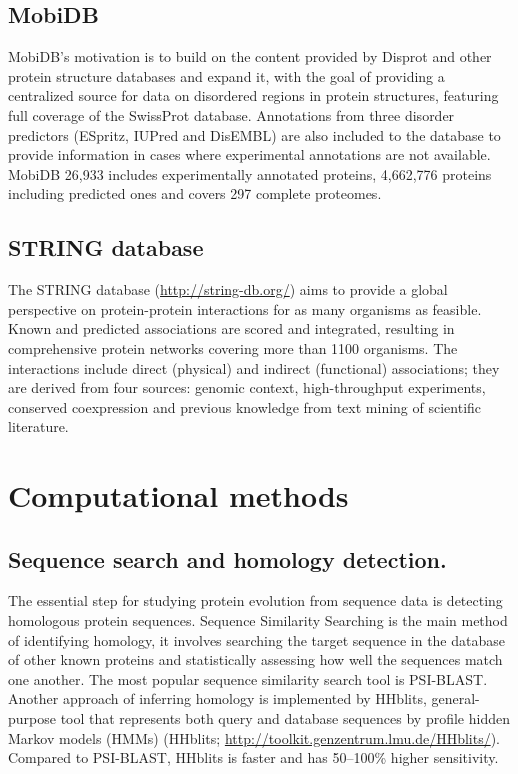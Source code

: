 \documentclass[11pt, a4paper,oneside]{report}
\begin{document}
\subsection{MobiDB}
MobiDB's motivation is to build on the content provided by Disprot and other protein structure databases and expand it, with the goal of providing a centralized source for data on disordered regions in protein structures, featuring full coverage of the SwissProt database. Annotations from three disorder predictors (ESpritz, IUPred and DisEMBL) are also included to the database to provide information in cases where experimental annotations are not available. MobiDB 26,933 includes experimentally annotated proteins, 4,662,776 proteins including predicted ones and covers 297 complete proteomes\cite{DiDomenico2012}.
\subsection{STRING database}
The STRING database (\url{http://string-db.org/}) aims to provide a global perspective on protein-protein interactions for as many organisms as feasible\cite{Franceschini2013}. Known and predicted associations are scored and integrated, resulting in comprehensive protein networks covering more than 1100 organisms. The interactions include direct (physical) and indirect (functional) associations; they are derived from four sources: genomic context, high-throughput experiments, conserved coexpression and previous knowledge from text mining of scientific literature.

\section{Computational methods}
\subsection{Sequence search and homology detection.} 
The essential step for studying protein evolution from sequence data is detecting homologous protein sequences. Sequence Similarity Searching is the main method of identifying homology, it involves searching the target sequence in the database of other known proteins and statistically assessing how well the sequences match one another. The most popular sequence similarity search tool is PSI-BLAST. Another approach of inferring homology is implemented by HHblits, general-purpose tool that represents both query and database sequences by profile hidden Markov models (HMMs) (HHblits; \url{http://toolkit.genzentrum.lmu.de/HHblits/}). Compared to PSI-BLAST, HHblits is faster and has 50--100\% higher sensitivity\cite{Remmert2012}.  
\end{document}
